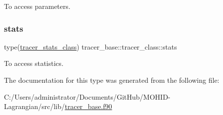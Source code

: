 To access parameters. 

\mbox{\label{structtracer__base_1_1tracer__class_a44167d106dc210e434106087e4a19578}} 
\subsubsection{\texorpdfstring{stats}{stats}}
{\footnotesize\ttfamily type(\mbox{\hyperlink{structtracer__base_1_1tracer__stats__class}{tracer\+\_\+stats\+\_\+class}}) tracer\+\_\+base\+::tracer\+\_\+class\+::stats\hspace{0.3cm}{\ttfamily [private]}}



To access statistics. 



The documentation for this type was generated from the following file\+:\begin{DoxyCompactItemize}
\item 
C\+:/\+Users/administrator/\+Documents/\+Git\+Hub/\+M\+O\+H\+I\+D-\/\+Lagrangian/src/lib/\mbox{\hyperlink{tracer__base_8f90}{tracer\+\_\+base.\+f90}}\end{DoxyCompactItemize}
